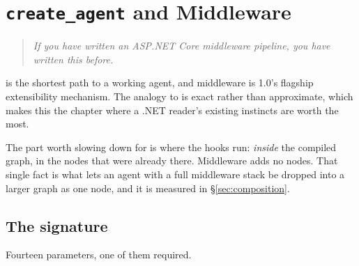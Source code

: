 \chapter{\texorpdfstring{\texttt{create\_agent}}{create\_agent} and Middleware}
\label{ch:agents}

\begin{quote}\itshape
If you have written an ASP.NET Core middleware pipeline, you have written this
before.
\end{quote}

\noindent
{} is the shortest path to a working agent, and middleware is
1.0's flagship extensibility mechanism. The analogy to
 is exact rather than approximate, which
makes this the chapter where a .NET reader's existing instincts are worth the
most.

The part worth slowing down for is where the hooks run: \emph{inside} the
compiled graph, in the nodes that were already there. Middleware adds no nodes.
That single fact is what lets an agent with a full middleware stack be dropped
into a larger graph as one node, and it is measured in \S\ref{sec:composition}.

\section{The signature}
\label{sec:create-agent-signature}

Fourteen parameters, one of them required.

